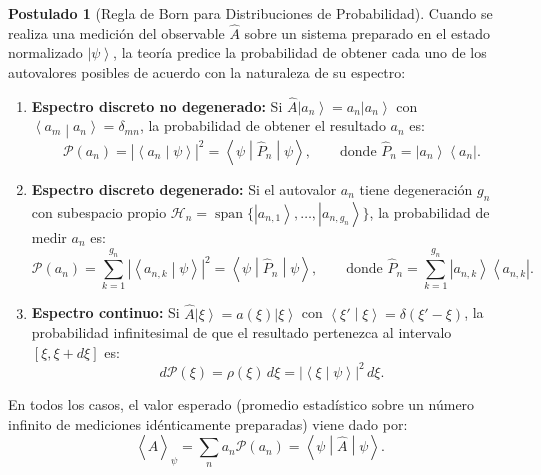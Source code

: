 \documentclass[11pt,a4paper,twoside]{report}
\theoremstyle{definition}
\newtheorem{postulado}{Postulado}[chapter]
\theoremstyle{plain}
\theoremstyle{remark}
\newcommand{\ket}[1]{\left| #1 \right\rangle}
\newcommand{\braket}[2]{\left\langle #1 \middle| #2 \right\rangle}
\newcommand{\ketbra}[2]{\left| #1 \right\rangle\!\left\langle #2 \right|}
\newcommand{\mel}[3]{\left\langle #1 \middle| #2 \middle| #3 \right\rangle}
\newcommand{\expval}[1]{\left\langle #1 \right\rangle}
\newcommand{\Hil}{\mathcal{H}}
\newcommand{\op}[1]{\hat{#1}}
\begin{document}
\begin{postulado}[Regla de Born para Distribuciones de Probabilidad]
Cuando se realiza una medición del observable $\op{A}$ sobre un sistema preparado en el estado normalizado $\ket{\psi}$, la teoría predice la probabilidad de obtener cada uno de los autovalores posibles de acuerdo con la naturaleza de su espectro:
\begin{enumerate}[label=\alph*)]
    \item \textbf{Espectro discreto no degenerado:} Si $\op{A}\ket{a_n} = a_n\ket{a_n}$ con $\braket{a_m}{a_n} = \delta_{mn}$, la probabilidad de obtener el resultado $a_n$ es:
    \begin{equation}
        \mathcal{P}(a_n) = |\braket{a_n}{\psi}|^2 = \mel{\psi}{\op{P}_n}{\psi}, \qquad \text{donde } \op{P}_n = \ketbra{a_n}{a_n}.
    \end{equation}
    \item \textbf{Espectro discreto degenerado:} Si el autovalor $a_n$ tiene degeneración $g_n$ con subespacio propio $\Hil_n = \operatorname{span}\{\ket{a_{n,1}}, \dots, \ket{a_{n,g_n}}\}$, la probabilidad de medir $a_n$ es:
    \begin{equation}
        \mathcal{P}(a_n) = \sum_{k=1}^{g_n} |\braket{a_{n,k}}{\psi}|^2 = \mel{\psi}{\op{P}_n}{\psi}, \qquad \text{donde } \op{P}_n = \sum_{k=1}^{g_n} \ketbra{a_{n,k}}{a_{n,k}}.
    \end{equation}
    \item \textbf{Espectro continuo:} Si $\op{A}\ket{\xi} = a(\xi)\ket{\xi}$ con $\braket{\xi'}{\xi} = \delta(\xi' - \xi)$, la probabilidad infinitesimal de que el resultado pertenezca al intervalo $[\xi, \xi + d\xi]$ es:
    \begin{equation}
        d\mathcal{P}(\xi) = \rho(\xi)\,d\xi = |\braket{\xi}{\psi}|^2\,d\xi.
    \end{equation}
\end{enumerate}
En todos los casos, el valor esperado (promedio estadístico sobre un número infinito de mediciones idénticamente preparadas) viene dado por:
\begin{equation}
    \expval{\op{A}}_\psi = \sum_n a_n \mathcal{P}(a_n) = \mel{\psi}{\op{A}}{\psi}.
\end{equation}
\end{postulado}
\end{document}
